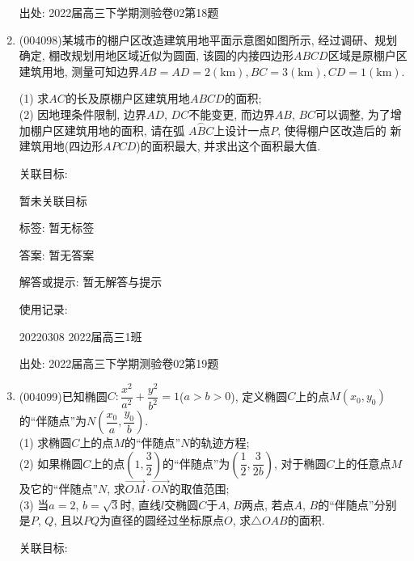 \documentclass[10pt,a4paper]{article}
\begin{document}
\begin{enumerate}[1.]
出处: 2022届高三下学期测验卷02第18题
\item { (004098)}某城市的棚户区改造建筑用地平面示意图如图所示, 经过调研、规划确定, 棚改规划用地区域近似为圆面, 该圆的内接四边形$ABCD$区域是原棚户区建筑用地, 测量可知边界$AB=AD=2(\text{km}), BC=3(\text{km}),CD=1(\text{km})$.\\
\begin{center}
\end{center}
(1) 求$AC$的长及原棚户区建筑用地$ABCD$的面积;\\
(2) 因地理条件限制, 边界$AD$, $DC$不能变更, 而边界$AB$, $BC$可以调整, 为了增加棚户区建筑用地的面积, 请在弧 $\overset\frown{ABC}$上设计一点$P$, 使得棚户区改造后的
新建筑用地(四边形$APCD$)的面积最大, 并求出这个面积最大值.


关联目标:

暂未关联目标



标签: 暂无标签

答案: 暂无答案

解答或提示: 暂无解答与提示

使用记录:

20220308	2022届高三1班		


出处: 2022届高三下学期测验卷02第19题
\item { (004099)}已知椭圆$C:\dfrac{x^2}{a^2}+\dfrac{y^2}{b^2}=1$($a>b>0$), 定义椭圆$C$上的点$M(x_0,y_0)$的``伴随点''为$N(\dfrac{x_0}a,\dfrac{y_0}b)$.\\
(1) 求椭圆$C$上的点$M$的``伴随点''$N$的轨迹方程;\\
(2) 如果椭圆$C$上的点$(1,\dfrac 32)$的``伴随点''为$(\dfrac 12,\dfrac 3{2b})$, 对于椭圆$C$上的任意点$M$及它的``伴随点''$N$, 求$\overrightarrow{OM}\cdot \overrightarrow{ON}$的取值范围;\\
(3) 当$a=2$, $b=\sqrt 3$时, 直线$l$交椭圆$C$于$A$, $B$两点, 若点$A$, $B$的``伴随点''分别是$P$, $Q$, 且以$PQ$为直径的圆经过坐标原点$O$, 求$\triangle OAB$的面积.


关联目标:


\end{enumerate}
\end{document}
